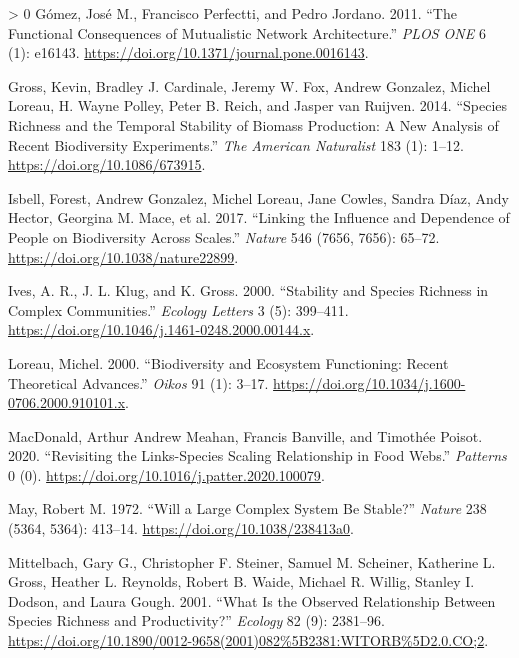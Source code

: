 \documentclass[11pt]{article}
\newlength{\cslhangindent}
\newenvironment{CSLReferences}[3] %
 {%
  \setlength{\parindent}{0pt}
  \ifodd #1 \everypar{\setlength{\hangindent}{\cslhangindent}}\ignorespaces\fi
  \ifnum #2 > 0
  \setlength{\parskip}{#2\baselineskip}
  \fi
 }%
 {}
\begin{document}
\begin{CSLReferences}{1}{0}
\leavevmode\hypertarget{ref-Gomez2011FunCona}{}%
Gómez, José M., Francisco Perfectti, and Pedro Jordano. 2011. {``The
Functional Consequences of Mutualistic Network Architecture.''}
\emph{PLOS ONE} 6 (1): e16143.
\url{https://doi.org/10.1371/journal.pone.0016143}.

\leavevmode\hypertarget{ref-Gross2014SpeRic}{}%
Gross, Kevin, Bradley J. Cardinale, Jeremy W. Fox, Andrew Gonzalez,
Michel Loreau, H. Wayne Polley, Peter B. Reich, and Jasper van Ruijven.
2014. {``Species Richness and the Temporal Stability of Biomass
Production: A New Analysis of Recent Biodiversity Experiments.''}
\emph{The American Naturalist} 183 (1): 1--12.
\url{https://doi.org/10.1086/673915}.

\leavevmode\hypertarget{ref-Isbell2017LinInf}{}%
Isbell, Forest, Andrew Gonzalez, Michel Loreau, Jane Cowles, Sandra
Díaz, Andy Hector, Georgina M. Mace, et al. 2017. {``Linking the
Influence and Dependence of People on Biodiversity Across Scales.''}
\emph{Nature} 546 (7656, 7656): 65--72.
\url{https://doi.org/10.1038/nature22899}.

\leavevmode\hypertarget{ref-Ives2000StaSpe}{}%
Ives, A. R., J. L. Klug, and K. Gross. 2000. {``Stability and Species
Richness in Complex Communities.''} \emph{Ecology Letters} 3 (5):
399--411. \url{https://doi.org/10.1046/j.1461-0248.2000.00144.x}.

\leavevmode\hypertarget{ref-Loreau2000BioEco}{}%
Loreau, Michel. 2000. {``Biodiversity and Ecosystem Functioning: Recent
Theoretical Advances.''} \emph{Oikos} 91 (1): 3--17.
\url{https://doi.org/10.1034/j.1600-0706.2000.910101.x}.

\leavevmode\hypertarget{ref-MacDonald2020RevLin}{}%
MacDonald, Arthur Andrew Meahan, Francis Banville, and Timothée Poisot.
2020. {``Revisiting the Links-Species Scaling Relationship in Food
Webs.''} \emph{Patterns} 0 (0).
\url{https://doi.org/10.1016/j.patter.2020.100079}.

\leavevmode\hypertarget{ref-May1972WilLar}{}%
May, Robert M. 1972. {``Will a Large Complex System Be Stable?''}
\emph{Nature} 238 (5364, 5364): 413--14.
\url{https://doi.org/10.1038/238413a0}.

\leavevmode\hypertarget{ref-Mittelbach2001WhaObs}{}%
Mittelbach, Gary G., Christopher F. Steiner, Samuel M. Scheiner,
Katherine L. Gross, Heather L. Reynolds, Robert B. Waide, Michael R.
Willig, Stanley I. Dodson, and Laura Gough. 2001. {``What Is the
Observed Relationship Between Species Richness and Productivity?''}
\emph{Ecology} 82 (9): 2381--96.
\url{https://doi.org/10.1890/0012-9658(2001)082\%5B2381:WITORB\%5D2.0.CO;2}.


\end{CSLReferences}
\end{document}
